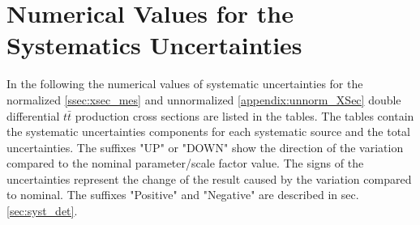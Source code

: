 \chapter{Numerical Values for the Systematics Uncertainties}\label{appendix:syst_unnorm}

In the following the numerical values of systematic uncertainties for the normalized \ref{ssec:xsec_mes} and unnormalized \ref{appendix:unnorm_XSec}
double differential $t\bar{t}$ production cross sections 
are listed in the tables. The tables contain the systematic uncertainties components for each systematic source
and the total uncertainties. The suffixes "UP" or "DOWN" show the direction of the variation compared to the nominal
parameter/scale factor value. The signs of the uncertainties represent the change of the result caused by the variation
compared to nominal. The suffixes "Positive" and "Negative" are described in sec. \ref{sec:syst_det}.

% 
% 

% 


% 



% 


% 


% 

